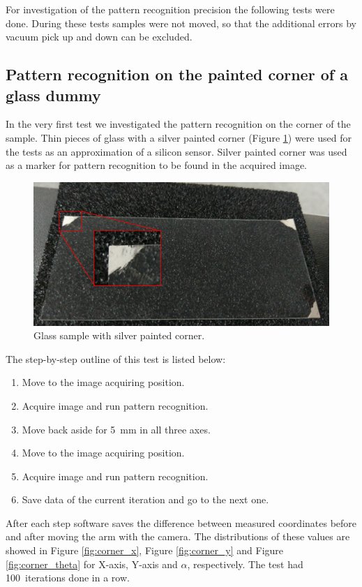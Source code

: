 For investigation of the pattern recognition precision the following tests were done. During these tests samples were not moved, so that the additional errors by vacuum pick up and down can be excluded.

\subsection{Pattern recognition on the painted corner of a glass dummy}
In the very first test we investigated the pattern recognition on the corner of the sample. Thin pieces of glass with a silver painted corner (Figure \ref{fig:painted_corner}) were used for the tests as an approximation of a silicon sensor. Silver painted corner was used as a marker for pattern recognition to be found in the acquired image.  

\begin{figure}[ht]\centering
\includegraphics[width=0.8\linewidth]{Data/Precision_tests/Painted_corner.png}
\caption{Glass sample with silver painted corner.}
\label{fig:painted_corner}
\end{figure}

The step-by-step outline of this test is listed below:
\begin{enumerate}
\setlength\itemsep{-0.5em}
\item Move to the image acquiring position.
\item Acquire image and run pattern recognition.
\item Move back aside for 5~mm in all three axes.
\item Move to the image acquiring position.
\item Acquire image and run pattern recognition.
\item Save data of the current iteration and go to the next one.
\end{enumerate}

After each step software saves the difference between measured coordinates before and after moving the arm with the camera. The distributions of these values are showed in Figure \ref{fig:corner_x}, Figure \ref{fig:corner_y} and Figure \ref{fig:corner_theta} for X-axis, Y-axis and $\alpha$, respectively. The test had 100~iterations done in a row.

